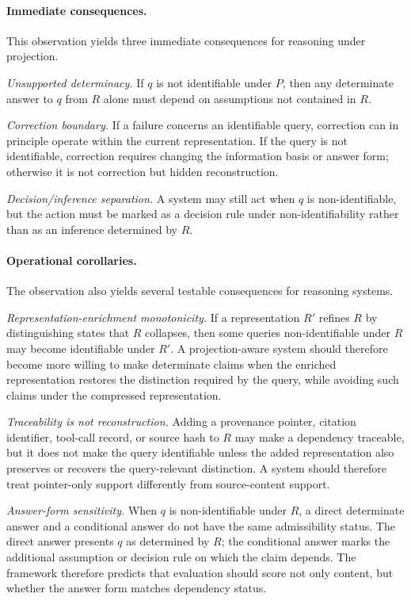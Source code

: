 \documentclass[11pt]{article}
\begin{document}
\paragraph{Immediate consequences.}
This observation yields three immediate consequences for reasoning under projection.

\emph{Unsupported determinacy.}
If $q$ is not identifiable under $P$, then any determinate answer to $q$ from $R$ alone must depend on assumptions not contained in $R$.

\emph{Correction boundary.}
If a failure concerns an identifiable query, correction can in principle operate within the current representation. If the query is not identifiable, correction requires changing the information basis or answer form; otherwise it is not correction but hidden reconstruction.

\emph{Decision/inference separation.}
A system may still act when $q$ is non-identifiable, but the action must be marked as a decision rule under non-identifiability rather than as an inference determined by $R$.

\paragraph{Operational corollaries.}
The observation also yields several testable consequences for reasoning systems.

\emph{Representation-enrichment monotonicity.}
If a representation $R'$ refines $R$ by distinguishing states that $R$ collapses, then some queries non-identifiable under $R$ may become identifiable under $R'$. A projection-aware system should therefore become more willing to make determinate claims when the enriched representation restores the distinction required by the query, while avoiding such claims under the compressed representation.

\emph{Traceability is not reconstruction.}
Adding a provenance pointer, citation identifier, tool-call record, or source hash to $R$ may make a dependency traceable, but it does not make the query identifiable unless the added representation also preserves or recovers the query-relevant distinction. A system should therefore treat pointer-only support differently from source-content support.

\emph{Answer-form sensitivity.}
When $q$ is non-identifiable under $R$, a direct determinate answer and a conditional answer do not have the same admissibility status. The direct answer presents $q$ as determined by $R$; the conditional answer marks the additional assumption or decision rule on which the claim depends. The framework therefore predicts that evaluation should score not only content, but whether the answer form matches dependency status.
\end{document}
